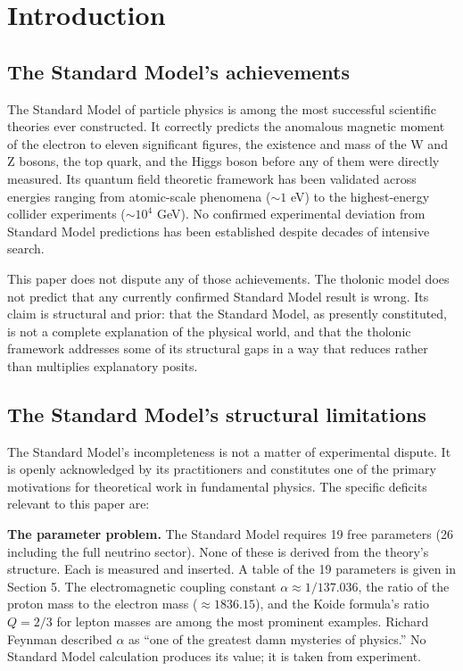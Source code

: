 \documentclass[12pt]{article}
\begin{document}
\section{Introduction}\label{introduction}

\subsection{The Standard Model's achievements}\label{the-standard-models-achievements}

The Standard Model of particle physics is among the most successful
scientific theories ever constructed. It correctly predicts the
anomalous magnetic moment of the electron to eleven significant figures,
the existence and mass of the W and Z bosons, the top quark, and the
Higgs boson before any of them were directly measured. Its quantum field
theoretic framework has been validated across energies ranging from
atomic-scale phenomena (\(\sim 1\) eV) to the highest-energy collider
experiments (\(\sim 10^4\) GeV). No confirmed experimental deviation
from Standard Model predictions has been established despite decades of
intensive search.

This paper does not dispute any of those achievements. The tholonic
model does not predict that any currently confirmed Standard Model
result is wrong. Its claim is structural and prior: that the Standard
Model, as presently constituted, is not a complete explanation of the
physical world, and that the tholonic framework addresses some of its
structural gaps in a way that reduces rather than multiplies explanatory
posits.

\subsection{The Standard Model's structural limitations}\label{the-standard-models-structural-limitations}

The Standard Model's incompleteness is not a matter of experimental
dispute. It is openly acknowledged by its practitioners and constitutes
one of the primary motivations for theoretical work in fundamental
physics. The specific deficits relevant to this paper are:

\textbf{The parameter problem.} The Standard Model requires 19 free
parameters (26 including the full neutrino sector). None of these is
derived from the theory's structure. Each is measured and inserted. A
table of the 19 parameters is given in Section 5. The electromagnetic
coupling constant \(\alpha \approx 1/137.036\), the ratio of the proton
mass to the electron mass (\(\approx 1836.15\)), and the Koide formula's
ratio \(Q = 2/3\) for lepton masses are among the most prominent
examples. Richard Feynman described \(\alpha\) as ``one of the greatest
damn mysteries of physics.'' No Standard Model calculation produces its
value; it is taken from experiment.
\end{document}
